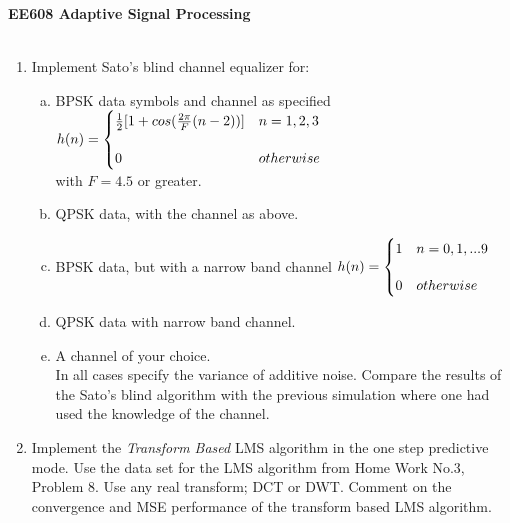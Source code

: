 \documentclass[journal,12pt,onecolumn]{IEEEtran}
\begin{document}
\centering \textbf{EE608  Adaptive Signal Processing}\\
\medskip
{}\\
\medskip
\begin{enumerate}
\item Implement Sato’s blind channel equalizer for:
\medskip
\begin{enumerate}[(a)]
\item BPSK data symbols and channel as specified\\
\bigskip
$h(n)=\begin{cases}
\bigskip
\frac{1}{2}[1+cos(\frac{2\pi}{F}{(n-2)})]& n=1,2,3\\
0 & otherwise
\end{cases}$\\
with $F=4.5$ or greater.
\item QPSK data, with the channel as above.
\item BPSK data, but with a narrow band channel
$h(n)=\begin{cases}
\bigskip
{1}&  n=0,1,... 9\\
0&  otherwise
\end{cases}$\\
\medskip
\item QPSK data with narrow band channel.
\item A channel of your choice.\\
In all cases specify the variance of additive noise.
\medskip
Compare the results of the Sato’s blind algorithm with the previous simulation where one had used the knowledge
of the channel.\\
\end{enumerate}
\medskip
\item Implement the \textit{Transform Based} LMS algorithm in the one step predictive mode. Use the data set for the LMS
algorithm from Home Work No.3, Problem 8. Use any real transform; DCT or DWT. Comment on the convergence
and MSE performance of the transform based LMS algorithm.






























\end{enumerate}
\end{document}
